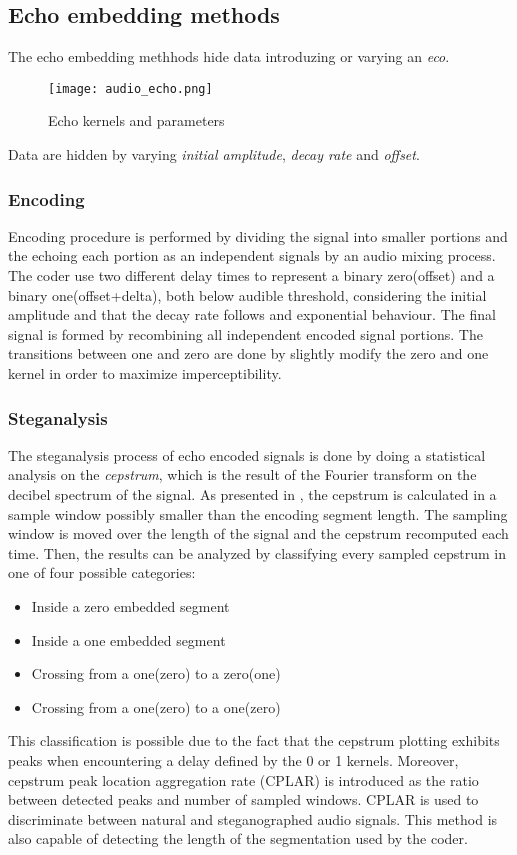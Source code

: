 \documentclass[../../main.tex]{subfiles}
\begin{document}
\subsection{Echo embedding methods}
The echo embedding methhods hide data introduzing or varying an \emph{eco}.
\begin{figure}[h]
    \centering
    \caption{Echo kernels and parameters}
    \texttt{[image: audio\_echo.png]}
\end{figure}
Data are hidden by varying \emph{initial amplitude}, \emph{decay rate} and
\emph{offset}.
\subsubsection{Encoding}
Encoding procedure is performed by dividing the signal into smaller
portions and the echoing each portion as an independent signals by an audio
mixing process.
The coder use two different delay times to represent a binary zero(offset)
and a binary one(offset+delta), both below audible threshold, considering
the initial amplitude and that the decay rate follows and exponential
behaviour.
The final signal is formed by recombining all independent encoded signal
portions.
The transitions between one and zero are done by slightly modify the zero
and one kernel in order to maximize imperceptibility.
\subsubsection{Steganalysis}
The steganalysis process of echo encoded signals is done by doing a
statistical analysis on the \emph{cepstrum}, which is the result of the
Fourier transform on the decibel spectrum of the signal.
As presented in \cite{review-audio-steganalysis}, the cepstrum is calculated
in a sample window possibly smaller than the encoding segment length.
The sampling window is moved over the length of the signal and the cepstrum
recomputed each time.
Then, the results can be analyzed by classifying every sampled cepstrum in
one of four possible categories:
\begin{itemize}
    \item Inside a zero embedded segment
    \item Inside a one embedded segment
    \item Crossing from a one(zero) to a zero(one)
    \item Crossing from a one(zero) to a one(zero)
\end{itemize}
This classification is possible due to the fact that the cepstrum plotting
exhibits peaks when encountering a delay defined by the 0 or 1 kernels.
Moreover, cepstrum peak location aggregation rate (CPLAR) is introduced as
the ratio between detected peaks and number of sampled windows.
CPLAR is used to discriminate between natural and steganographed audio
signals.
This method is also capable of detecting the length of the segmentation
used by the coder.
\end{document}
